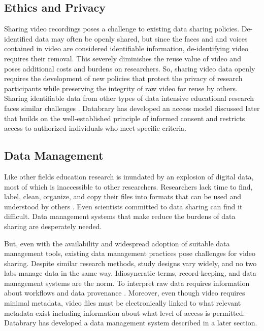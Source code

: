 \documentclass[letterpaper,man,apacite]{apa6}
\begin{document}
\subsection{Ethics and Privacy}

Sharing video recordings poses a challenge to existing data sharing policies.
De-identified data \cite{HHS} may often be openly shared, but since the faces and and voices contained in video are considered identifiable information, de-identifying video requires their removal.
This severely diminishes the reuse value of video and poses additional costs and burdens on researchers.
So, sharing video data openly requires the development of new policies that protect the privacy of research participants while preserving the integrity of raw video for reuse by others.
Sharing identifiable data from other types of data intensive educational research faces similar challenges \cite{Asilomar2014}. 
Databrary has developed an access model discussed later that builds on the well-established principle of informed consent and restricts access to authorized individuals who meet specific criteria.

\subsection{Data Management}

Like other fields \cite{Overpeck2011} education research is inundated by an explosion of digital data, most of which is inaccessible to other researchers.
Researchers lack time to find, label, clean, organize, and copy their files into formats that can be used and understood by others \cite{Ascoli2006}. 
Even scientists committed to data sharing can find it difficult. 
Data management systems that make reduce the burdens of data sharing are desperately needed.

But, even with the availability and widespread adoption of suitable data management tools, existing data management practices pose challenges for video sharing.
Despite similar research methods, study designs vary widely, and no two labs manage data in the same way. 
Idiosyncratic terms, record-keeping, and data management systems are the norm. 
To interpret raw data requires information about workflows and data provenance \cite{curry2011}. 
Moreover, even though video requires minimal metadata, video files must be electronically linked to what relevant metadata exist including information about what level of access is permitted. 
Databrary has developed a data management system described in a later section.
\end{document}
